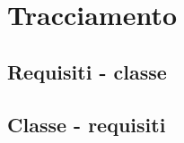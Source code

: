 \documentclass[12pt,a4paper]{article}
\begin{document}


\newpage

\section{Tracciamento}

\subsection{Requisiti - classe}
%

\newpage

\subsection{Classe - requisiti}
%
\end{document}
